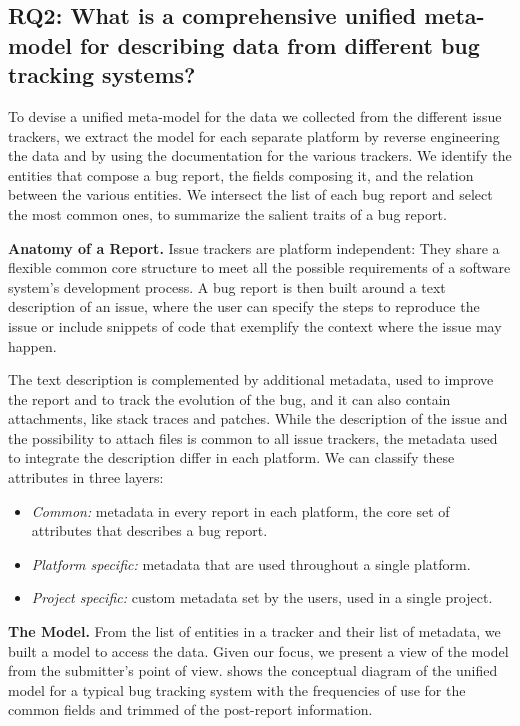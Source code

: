 \subsection*{RQ2: What is a comprehensive unified meta-model for describing data from different bug tracking systems?}\label{sec:model}

To devise a unified meta-model for the data we collected from the different issue trackers, we extract the model for each separate platform by reverse engineering the data and by using the documentation for the various trackers. We identify the entities that compose a bug report, the fields  composing it, and the relation between the various entities. We intersect the list of each bug report and select the most common ones, to summarize the salient traits of a bug report.

{\bfseries Anatomy of a Report.} Issue trackers are platform independent: They share a flexible common core structure to meet all the possible requirements of a software system's development process. A bug report is then built around a text description of an issue, where the user can specify the steps to reproduce the issue or include snippets of code that exemplify the context where the issue may happen. 

The text description is complemented by additional metadata, used to improve the report and to track the evolution of the bug, and it can also contain attachments, like stack traces and patches. While the description of the issue and the possibility to attach files is common to all issue trackers, the metadata used to integrate the description differ in each platform. We can classify these attributes in three layers:

\begin{itemize}[$\circ$]
 \item {\it Common:} metadata in every report in each platform, \ie the core set of attributes that describes a bug report.
 \item {\it Platform specific:} metadata that are used throughout a single platform.
 \item {\it Project specific:} custom metadata set by the users, used in a single project.
\end{itemize}

{\bfseries The Model.} From the list of entities in a tracker and their list of metadata, we built a model to access the data. Given our focus, we present a view of the model from the submitter's point of view.  shows the conceptual diagram of the unified model for a typical bug tracking system with the frequencies of use for the common fields and trimmed of the post-report information. %


